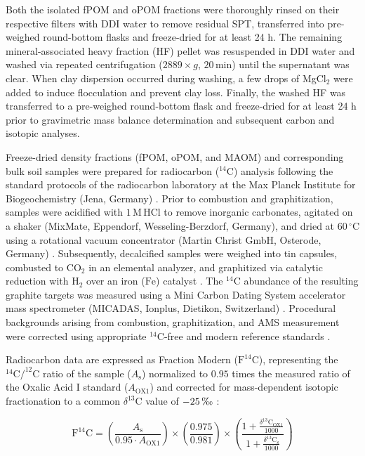 \documentclass[preprint,12pt]{elsarticle}
\begin{document}
Both the isolated fPOM and oPOM fractions were thoroughly rinsed on their respective filters with DDI water to remove residual SPT, transferred into pre-weighed round-bottom flasks and freeze-dried for at least 24 h. The remaining mineral-associated heavy fraction (HF) pellet was resuspended in DDI water and washed via repeated centrifugation ($2889 \times g$, $20\,\text{min}$) until the supernatant was clear. When clay dispersion occurred during washing, a few drops of MgCl$_2$ were added to induce flocculation and prevent clay loss. Finally, the washed HF was transferred to a pre-weighed round-bottom flask and freeze-dried for at least 24 h prior to gravimetric mass balance determination and subsequent carbon and isotopic analyses.

Freeze-dried density fractions (fPOM, oPOM, and MAOM) and corresponding bulk soil samples were prepared for radiocarbon ($^{14}\text{C}$) analysis following the standard protocols of the radiocarbon laboratory at the Max Planck Institute for Biogeochemistry (Jena, Germany) \citep{Steinhof2017}. Prior to combustion and graphitization, samples were acidified with $1\,\text{M}\,\text{HCl}$ to remove inorganic carbonates, agitated on a shaker (MixMate, Eppendorf, Wesseling-Berzdorf, Germany), and dried at $60\,^{\circ}\text{C}$ using a rotational vacuum concentrator (Martin Christ GmbH, Osterode, Germany) \citep{Steinhof2017}. Subsequently, decalcified samples were weighed into tin capsules, combusted to $\text{CO}_2$ in an elemental analyzer, and graphitized via catalytic reduction with $\text{H}_2$ over an iron ($\text{Fe}$) catalyst \citep{Steinhof2017}. The $^{14}\text{C}$ abundance of the resulting graphite targets was measured using a Mini Carbon Dating System accelerator mass spectrometer (MICADAS, Ionplus, Dietikon, Switzerland) \citep{Steinhof2017}. Procedural backgrounds arising from combustion, graphitization, and AMS measurement were corrected using appropriate $^{14}\text{C}$-free and modern reference standards \citep{Steinhof2017}.

Radiocarbon data are expressed as Fraction Modern ($\text{F}^{14}\text{C}$), representing the $^{14}\text{C}/^{12}\text{C}$ ratio of the sample ($A_{\text{s}}$) normalized to $0.95$ times the measured ratio of the Oxalic Acid I standard ($A_{\text{OX1}}$) and corrected for mass-dependent isotopic fractionation to a common $\delta^{13}\text{C}$ value of $-25\,\text{\textperthousand}$ \citep{Stuiver1977, Trumbore2009}:

\begin{equation}
\text{F}^{14}\text{C} = \left( \frac{A_{\text{s}}}{0.95 \cdot A_{\text{OX1}}} \right) \times \left( \frac{0.975}{0.981} \right) \times \left( \frac{1 + \frac{\delta^{13}\text{C}_{\text{OX1}}}{1000}}{1 + \frac{\delta^{13}\text{C}_{\text{s}}}{1000}} \right)
\end{equation}
\end{document}
